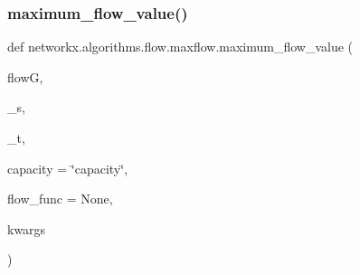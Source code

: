 \subsubsection{\texorpdfstring{maximum\+\_\+flow\+\_\+value()}{maximum\_flow\_value()}}
{\footnotesize\ttfamily def networkx.\+algorithms.\+flow.\+maxflow.\+maximum\+\_\+flow\+\_\+value (\begin{DoxyParamCaption}\item[{}]{flowG,  }\item[{}]{\+\_\+s,  }\item[{}]{\+\_\+t,  }\item[{}]{capacity = {\ttfamily \char`\"{}capacity\char`\"{}},  }\item[{}]{flow\+\_\+func = {\ttfamily None},  }\item[{}]{kwargs }\end{DoxyParamCaption})}

